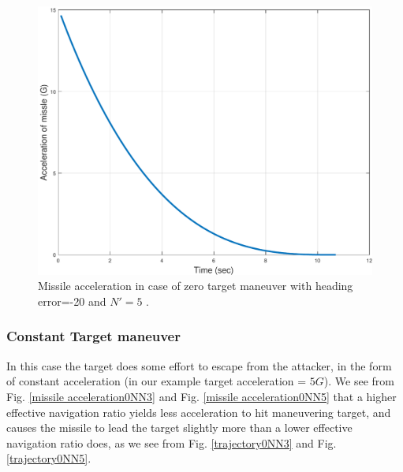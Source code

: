 \begin{figure}[H]
	\centering
	\includegraphics[scale = 0.57]{fig/MissileAccelerationXNT0HE20N5.pdf}
	\caption{Missile acceleration in case of zero target maneuver with heading error=-20 and $N'=5$ .}
	\label{missile acceleration20N5}
\end{figure}


\subsubsection{Constant Target maneuver}
In this case the target does some effort to escape from the attacker, in the form of constant acceleration (in our example target acceleration = $5G$).
We see from Fig. \ref{missile acceleration0NN3} and Fig. \ref{missile acceleration0NN5} that a higher effective navigation ratio yields less acceleration to hit maneuvering target, and causes the missile to lead the target slightly more than a lower effective navigation ratio does, as we see from Fig. \ref{trajectory0NN3} and Fig. \ref{trajectory0NN5}.



